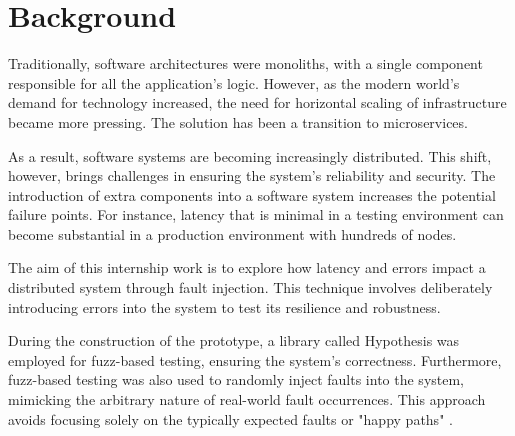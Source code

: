 \chapter{\centering Background}

Traditionally, software architectures were monoliths, with a single component
responsible for all the application's logic. However, as the modern world's
demand for technology increased, the need for horizontal scaling of
infrastructure became more pressing. The solution has been a transition to
microservices.

As a result, software systems are becoming increasingly distributed. This
shift, however, brings challenges in ensuring the system's reliability and
security. The introduction of extra components into a software system increases
the potential failure points. For instance, latency that is minimal in a
testing environment can become substantial in a production environment with
hundreds of nodes.

The aim of this internship work is to explore how latency and errors impact a
distributed system through fault injection. This technique involves
deliberately introducing errors into the system to test its resilience and
robustness.

During the construction of the prototype, a library called Hypothesis was
employed for fuzz-based testing, ensuring the system's correctness.
Furthermore, fuzz-based testing was also used to randomly inject faults into
the system, mimicking the arbitrary nature of real-world fault occurrences.
This approach avoids focusing solely on the typically expected faults or "happy
paths" \cite{happy_path}.

